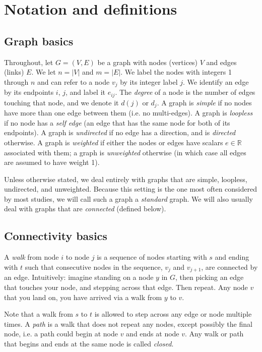 \section{Notation and definitions}\label{sec:notation}
\subsection{Graph basics}\label{sec:notation:graph}
Throughout, let $G = (V,E)$ be a graph with nodes (vertices) $V$ and edges (links) $E$. We let $n = |V|$ and $m = |E|$. We label the nodes with integers 1 through $n$ and can refer to a node $v_j$ by its integer label $j$. We identify an edge by its endpoints $i$, $j$, and label it $e_{ij}$. The \emph{degree} of a node is the number of edges touching that node, and we denote it $d(j)$ or $d_j$.
A graph is \emph{simple} if no nodes have more than one edge between them (i.e. no multi-edges). A graph is \emph{loopless} if no node has a \emph{self edge} (an edge that has the same node for both of its endpoints). A graph is \emph{undirected} if no edge has a direction, and is \emph{directed} otherwise. A graph is \emph{weighted} if either the nodes or edges have scalars $e \in \mathbb{R}$ associated with them; a graph is \emph{unweighted} otherwise (in which case all edges are assumed to have weight 1).

Unless otherwise stated, we deal entirely with graphs that are simple, loopless, undirected, and unweighted. Because this setting is the one most often considered by most studies, we will call such a graph a \emph{standard} graph. We will also usually deal with graphs that are \emph{connected} (defined below).

\subsection{Connectivity basics}\label{sec:notation:connect}
A \emph{walk} from node $i$ to node $j$ is a sequence of nodes starting with $s$ and ending with $t$ such that consecutive nodes in the sequence, $v_{j}$ and $v_{j+1}$, are connected by an edge. Intuitively: imagine standing on a node $y$ in $G$, then picking an edge that touches your node, and stepping across that edge. Then repeat. Any node $v$ that you land on, you have arrived via a walk from $y$ to $v$.

Note that a walk from $s$ to $t$ is allowed to step across any edge or node multiple times.
A \emph{path} is a walk that does not repeat any nodes, except possibly the final node, i.e. a path could begin at node $v$ and ends at node $v$. Any walk or path that begins and ends at the same node is called \emph{closed}.

